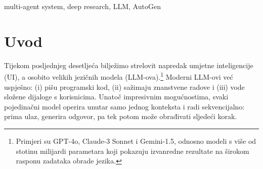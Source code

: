 \documentclass[zavrsnirad]{fer}
\begin{document}
\begin{abstract}
This paper presents the design, implementation, and evaluation of \textit{DeepResearch}, a multi-agent system based on large language models (LLMs) designed for reliable deep web search and automated analysis of collected information. The main contribution of this work is the development of a layered, multi-specialist agent architecture that distributes responsibilities across cooperating agents.

The system comprises four agents based on Google’s Gemini 2.5 Pro model: a researcher, verifier, summarizer, and user proxy. These agents interact within a controlled group chat environment coordinated by the \textit{SelectorGroupChat} mechanism. Custom tools were developed to support web content retrieval and integration with the Google Search API, enabling efficient and focused data collection.

We compare our system with OpenAI’s reference implementation based on GPT-4o and observe significant speedups (up to 8×), reduced token usage, and more stable throughput, particularly on tasks of medium complexity. The architecture proves scalable, cost-efficient, and well-suited for real-time applications requiring concise, contextually accurate responses.
\end{abstract}

\begin{keywords}
multi-agent system, deep research, LLM, AutoGen
\end{keywords}

\newpage

\chapter{Uvod}

Tijekom posljednjeg desetljeća bilježimo strelovit napredak umjetne
inteligencije (UI), a osobito velikih jezičnih modela
(LLM-ova).\footnote{Primjeri su GPT-4o, Claude-3 Sonnet i Gemini-1.5,
  odnosno modeli s više od stotinu milijardi parametara koji pokazuju
  izvanredne rezultate na širokom rasponu zadataka obrade jezika.}
Moderni LLM-ovi već uspješno:
(i) pišu programski kod,
(ii) sažimaju znanstvene radove i
(iii) vode složene dijaloge s korisnicima.
Unatoč impresivnim mogućnostima, svaki pojedinačni model
operira unutar samo jednog konteksta i radi sekvencijalno: prima
ulaz, generira odgovor, pa tek potom može obrađivati sljedeći
korak.
\end{document}
